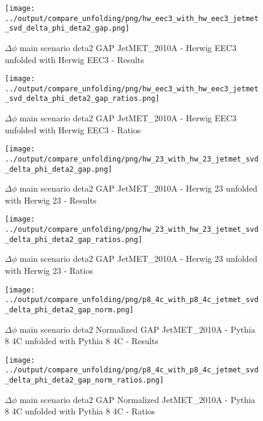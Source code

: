 \documentclass[11pt]{book}
\begin{document}
\begin{figure}[ht]
\centering
\texttt{[image: ../output/compare\_unfolding/png/hw\_eec3\_with\_hw\_eec3\_jetmet\_svd\_delta\_phi\_deta2\_gap.png]}
\caption{$\Delta\phi$ main scenario deta2 GAP JetMET\_2010A - Herwig EEC3 unfolded with Herwig EEC3 - Results}
\label{hw_eec3_hw_eec3_jetmet_svd_delta_phi_deta2_gap_a}
\end{figure}

\begin{figure}[ht]
\centering
\texttt{[image: ../output/compare\_unfolding/png/hw\_eec3\_with\_hw\_eec3\_jetmet\_svd\_delta\_phi\_deta2\_gap\_ratios.png]}
\caption{$\Delta\phi$ main scenario deta2 GAP JetMET\_2010A - Herwig EEC3 unfolded with Herwig EEC3 - Ratios}
\label{hw_eec3_hw_eec3_jetmet_svd_delta_phi_deta2_gap_b}
\end{figure}

\begin{figure}[ht]
\centering
\texttt{[image: ../output/compare\_unfolding/png/hw\_23\_with\_hw\_23\_jetmet\_svd\_delta\_phi\_deta2\_gap.png]}
\caption{$\Delta\phi$ main scenario deta2 GAP JetMET\_2010A - Herwig 23 unfolded with Herwig 23 - Results}
\label{hw_23_hw_23_jetmet_svd_delta_phi_deta2_gap_a}
\end{figure}

\begin{figure}[ht]
\centering
\texttt{[image: ../output/compare\_unfolding/png/hw\_23\_with\_hw\_23\_jetmet\_svd\_delta\_phi\_deta2\_gap\_ratios.png]}
\caption{$\Delta\phi$ main scenario deta2 GAP JetMET\_2010A - Herwig 23 unfolded with Herwig 23 - Ratios}
\label{hw_23_hw_23_jetmet_svd_delta_phi_deta2_gap_b}
\end{figure}


\begin{figure}[ht]
\centering
\texttt{[image: ../output/compare\_unfolding/png/p8\_4c\_with\_p8\_4c\_jetmet\_svd\_delta\_phi\_deta2\_gap\_norm.png]}
\caption{$\Delta\phi$ main scenario deta2 Normalized GAP JetMET\_2010A - Pythia 8 4C unfolded with Pythia 8 4C - Results}
\label{p8_p8_jetmet_svd_delta_phi_deta2_gap_norm_a}
\end{figure}

\begin{figure}[ht]
\centering
\texttt{[image: ../output/compare\_unfolding/png/p8\_4c\_with\_p8\_4c\_jetmet\_svd\_delta\_phi\_deta2\_gap\_norm\_ratios.png]}
\caption{$\Delta\phi$ main scenario deta2 GAP Normalized JetMET\_2010A - Pythia 8 4C unfolded with Pythia 8 4C - Ratios}
\label{p8_p8_jetmet_svd_delta_phi_deta2_gap_norm_b}
\end{figure}
\end{document}
